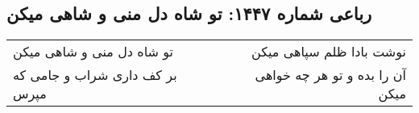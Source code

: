 \begin{center}
\section*{رباعی شماره ۱۴۴۷: تو شاه دل منی و شاهی میکن}
\label{sec:1447}
\begin{longtable}{l p{0.5cm} r}
تو شاه دل منی و شاهی میکن
&&
نوشت بادا ظلم سپاهی میکن
\\
بر کف داری شراب و جامی که مپرس
&&
آن را بده و تو هر چه خواهی میکن
\\
\end{longtable}
\end{center}
